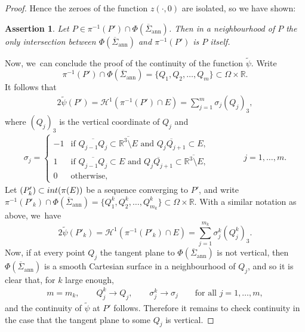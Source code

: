 \documentclass[11pt]{article}
\numberwithin{equation}{section}
\newcommand{\R}{\mathbb{R}}
\let\pointinspace P
\newcommand{\immclosedann}{\Phi({\overline\Sigma}_\mathrm{ann})}
\newcommand{\pointinOm}{P'}
\newtheorem{assertion}{Assertion}
\theoremstyle{definition}
\begin{document}
\begin{proof}
Hence the zeroes of the function $z(\cdot,0)$ are isolated, so we have
shown:

\begin{assertion}\label{assertionA}
Let $\pointinspace\in \pi^{-1}(\pointinOm)\cap
\immclosedann$. Then in a neighbourhood of $\pointinspace$
the only intersection between $\immclosedann$
and $\pi^{-1}(\pointinOm)$ is $\pointinspace$ itself.
\end{assertion}

Now, we~can conclude the proof of
the continuity of the function $\widetilde\psi$.
Write
\[
\pi^{-1}(\pointinOm)\cap
\immclosedann=\{Q_1,Q_2,\dots,Q_{m}\}\subset\Omega\times\R.
\]
It follows that
\begin{align}\label{verticalslice}
2\widetilde\psi(\pointinOm)=\mathcal H^1(\pi^{-1}(\pointinOm)\cap E)=\sum_{j=1}^m\sigma_j (Q_j)_3,
\end{align}
where $(Q_j)_3$ is the vertical coordinate of $Q_j$ and
\begin{align}
\sigma_j=\begin{cases}
-1&\text{if }\overline{Q_{j-1}Q_j}\subset\overline{ \R^3\setminus E}\text{ and }\overline{Q_{j}Q_{j+1}}\subset E,\\
1 &\text{if }\overline{Q_{j-1}Q_j}\subset E\text{ and }\overline{Q_{j}Q_{j+1}}\subset \overline{\R^3\setminus E},\\
0&\text{otherwise,}
\end{cases}
\qquad \qquad j=1,\dots,m.
\end{align}
Let $(\pointinOm_k)
\subset \textup{int}(\pi(E))$ be a sequence converging to $\pointinOm$, and write $\pi^{-1}
(\pointinOm_k )\cap \immclosedann=\{Q^k_1,Q^k_2,\dots,Q^k_{m_k}\}\subset\Omega\times\R$. With a similar
notation as above, we~have
\begin{equation}\label{verticalslice2}
2\widetilde\psi(\pointinOm_k)=\mathcal H^1(\pi^{-1}(\pointinOm_k)
\cap E)=\sum_{j=1}^{m_k}\sigma^k_j (Q^k_j)_3.
\end{equation}
Now, if at
every point $Q_j$ the tangent plane to $\immclosedann$
is not vertical, then $\immclosedann$ is a smooth Cartesian surface in a neighbourhood of
$Q_j$, and so it is clear that, for $k$ large enough,
\begin{align}\label{6.18}
m=m_k,\qquad
Q_j^k\to Q_j,\qquad \sigma^k_j\to\sigma_j\qquad\text{for all }j=1,\dots,m,
\end{align}
and the continuity of $\widetilde \psi$ at $P'$ follows.
Therefore it remains to check continuity in the case that the tangent plane to some $Q_j$ is vertical.


\end{proof}
\end{document}
